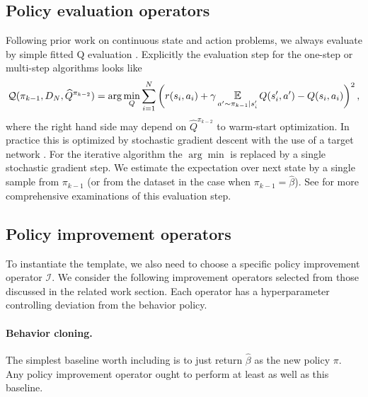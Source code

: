 \subsection{Policy evaluation operators}

Following prior work on continuous state and action problems, we always evaluate by simple fitted Q evaluation \citep{fujimoto2018off, kumar2019stabilizing, Siegel2020Keep, wang2020critic, paine2020hyperparameter, wang2021instabilities}.
Explicitly the evaluation step for the one-step or multi-step algorithms looks like
\begin{align}
     \mathcal{Q}(\pi_{k-1}, D_N, \widehat Q^{\pi_{k-2}}) = \arg\min_Q \sum_{i=1}^N \left(r(s_i,a_i) + \gamma \E_{a'\sim \pi_{k-1}|s_i'}Q(s_i', a') - Q(s_i, a_i) \right)^2,
\end{align}
where the right hand side may depend on $\widehat Q^{\pi_{k-2}}$ to warm-start optimization.
In practice this is optimized by stochastic gradient descent with the use of a target network \citep{mnih2015human}.
For the iterative algorithm the $ \arg\min$ is replaced by a single stochastic gradient step.
We estimate the expectation over next state by a single sample from $ \pi_{k-1}$ (or from the dataset in the case when $ \pi_{k-1} = \hat \beta$). See \cite{voloshin2019empirical, wang2021instabilities} for more comprehensive examinations of this evaluation step.



\subsection{Policy improvement operators}

To instantiate the template, we also need to choose a specific policy improvement operator $ \mathcal{I}$. We consider the following improvement operators selected from those discussed in the related work section. Each operator has a hyperparameter controlling deviation from the behavior policy.

\paragraph{Behavior cloning.} The simplest baseline worth including is to just return $ \hat \beta$ as the new policy $ \pi$. Any policy improvement operator ought to perform at least as well as this baseline.


